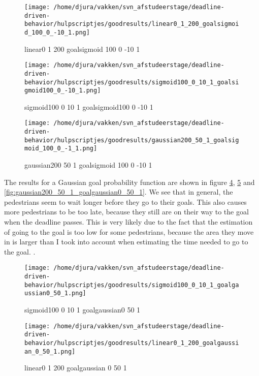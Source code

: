 \documentclass[11pt]{book}
\begin{document}
\begin{figure}
\centering
\texttt{[image: /home/djura/vakken/svn\_afstudeerstage/deadline-driven-behavior/hulpscriptjes/goodresults/linear0\_1\_200\_goalsigmoid\_100\_0\_-10\_1.png]}
\caption{linear0 1 200 goalsigmoid 100 0 -10 1}
\label{fig:linear0_1_200_goalsigmoid_100_0_-10_1}
\end{figure}


\begin{figure}
\centering
\texttt{[image: /home/djura/vakken/svn\_afstudeerstage/deadline-driven-behavior/hulpscriptjes/goodresults/sigmoid100\_0\_10\_1\_goalsigmoid100\_0\_-10\_1.png]}
\caption{sigmoid100 0 10 1 goalsigmoid100 0 -10 1}
\label{fig:sigmoid100_0_10_1_goalsigmoid100_0_-10_1}
\end{figure}

\begin{figure}
\centering
\texttt{[image: /home/djura/vakken/svn\_afstudeerstage/deadline-driven-behavior/hulpscriptjes/goodresults/gaussian200\_50\_1\_goalsigmoid\_100\_0\_-1\_1.png]}
\caption{gaussian200 50 1 goalsigmoid 100 0 -10 1}
\label{fig:gaussian200_50_1_goalsigmoid_100_0_-10_1}
\end{figure}

The results for a Gaussian goal probability function are shown in figure \ref{fig:sigmoid100_0_10_1_goalgaussian0_50_1}, \ref{fig:linear0_1_200_goalgaussian_0_50_1} and \ref{fig:gaussian200_50_1_goalgaussian0_50_1}. We see that in general, the pedestrians seem to wait longer before they go to their goals. This also causes more pedestrians to be too late, because they still are on their way to the goal when the deadline passes. This is very likely due to the fact that the estimation of going to the goal is too low for some pedestrians, because the area they move in is larger than I took into account when estimating the time needed to go to the goal. .


\begin{figure}[h]
\centering
\texttt{[image: /home/djura/vakken/svn\_afstudeerstage/deadline-driven-behavior/hulpscriptjes/goodresults/sigmoid100\_0\_10\_1\_goalgaussian0\_50\_1.png]}
\caption{sigmoid100 0 10 1 goalgaussian0 50 1}
\label{fig:sigmoid100_0_10_1_goalgaussian0_50_1}
\end{figure}

\begin{figure}[h]
\centering
\texttt{[image: /home/djura/vakken/svn\_afstudeerstage/deadline-driven-behavior/hulpscriptjes/goodresults/linear0\_1\_200\_goalgaussian\_0\_50\_1.png]}
\caption{linear0 1 200 goalgaussian 0 50 1}
\label{fig:linear0_1_200_goalgaussian_0_50_1}
\end{figure}
\end{document}

